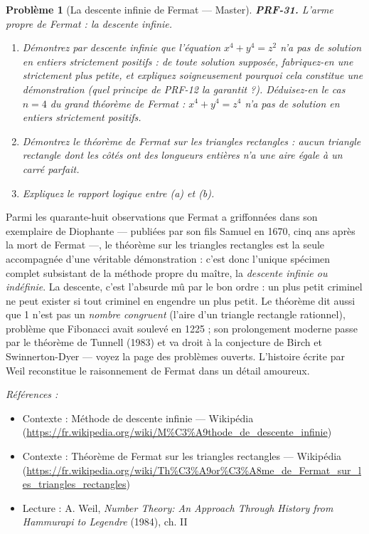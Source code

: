 \documentclass[11pt]{article}
\newtheorem{problem}{Problème}
\newenvironment{refs}{\par\small\noindent\emph{Références :}\begin{itemize}\setlength\itemsep{0pt}}{\end{itemize}\normalsize}
\begin{document}
\bigskip

\begin{problem}[{La descente infinie de Fermat --- Master}]
\textbf{PRF-31.} L'arme propre de Fermat : la \textit{descente infinie}.
\begin{enumerate}
\item[(a)] Démontrez par descente infinie que l'équation
$ x^4 + y^4 = z^2 $ n'a pas de solution en entiers strictement positifs : de toute
solution supposée, fabriquez-en une strictement plus petite, et expliquez soigneusement
pourquoi cela constitue une démonstration (quel principe de PRF-12 la garantit ?).
Déduisez-en le cas $ n = 4 $ du grand théorème de Fermat : $ x^4 + y^4 = z^4 $ n'a pas
de solution en entiers strictement positifs.
\item[(b)] Démontrez le théorème de Fermat
sur les triangles rectangles : aucun triangle rectangle dont les côtés ont des longueurs
entières n'a une aire égale à un carré parfait.
\item[(c)] Expliquez le rapport logique entre (a) et (b).
\end{enumerate}

\end{problem}

\noindent Parmi les quarante-huit observations que Fermat a griffonnées dans son
exemplaire de Diophante --- publiées par son fils Samuel en 1670, cinq ans après la mort de
Fermat ---, le théorème sur les triangles rectangles est la seule accompagnée d'une véritable
démonstration : c'est donc l'unique spécimen complet subsistant de la méthode propre du
maître, la \textit{descente infinie ou indéfinie}. La descente, c'est l'absurde mû par le bon
ordre : un plus petit criminel ne peut exister si tout criminel en engendre un plus petit. Le
théorème dit aussi que 1 n'est pas un \textit{nombre congruent} (l'aire d'un triangle rectangle
rationnel), problème que Fibonacci avait soulevé en 1225 ; son prolongement moderne passe par
le théorème de Tunnell (1983) et va droit à la conjecture de Birch et Swinnerton-Dyer ---
voyez la page des problèmes ouverts. L'histoire écrite par Weil reconstitue le raisonnement
de Fermat dans un détail amoureux.

\begin{refs}
\item Contexte : Méthode de descente infinie --- Wikipédia (\url{https://fr.wikipedia.org/wiki/M%C3%A9thode_de_descente_infinie})
\item Contexte : Théorème de Fermat sur les triangles rectangles --- Wikipédia (\url{https://fr.wikipedia.org/wiki/Th%C3%A9or%C3%A8me_de_Fermat_sur_les_triangles_rectangles})
\item Lecture : A. Weil, \textit{Number Theory: An Approach Through History from Hammurapi to Legendre} (1984), ch. II
\end{refs}
\end{document}
